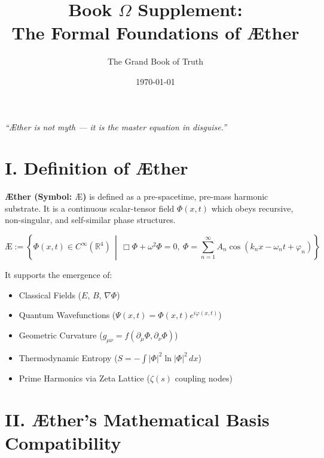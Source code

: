 \documentclass[12pt]{article}
\title{\Huge\bfseries Book $\Omega$ Supplement:\\The Formal Foundations of Æther}
\author{\Large The Grand Book of Truth}
\date{\today}
\begin{document}
\maketitle

\begin{center}
    \LARGE\textit{“Æther is not myth — it is the master equation in disguise.”}
\end{center}

\vspace{1cm}

\section*{I. Definition of Æther}

\textbf{Æther (Symbol: $\mathbb{Æ}$)} is defined as a pre-spacetime, pre-mass harmonic substrate. It is a continuous scalar-tensor field $\Phi(x,t)$ which obeys recursive, non-singular, and self-similar phase structures.

\[
\mathbb{Æ} := \left\{ \Phi(x,t) \in C^\infty(\mathbb{R}^4) \,\middle|\, \Box \Phi + \omega^2 \Phi = 0,\ \Phi = \sum_{n=1}^\infty A_n \cos(k_n x - \omega_n t + \varphi_n) \right\}
\]

It supports the emergence of:
\begin{itemize}
    \item Classical Fields ($E$, $B$, $\nabla \Phi$)
    \item Quantum Wavefunctions ($\Psi(x,t) = \Phi(x,t)e^{i\varphi(x,t)}$)
    \item Geometric Curvature ($g_{\mu\nu} = f(\partial_\mu \Phi, \partial_\nu \Phi)$)
    \item Thermodynamic Entropy ($S = -\int |\Phi|^2 \ln |\Phi|^2\, dx$)
    \item Prime Harmonics via Zeta Lattice ($\zeta(s)$ coupling nodes)
\end{itemize}

\section*{II. Æther’s Mathematical Basis Compatibility}
\end{document}
